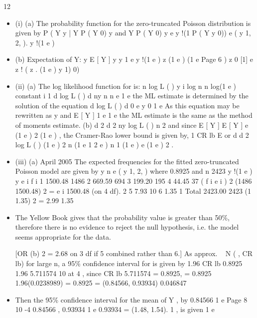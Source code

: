 \documentclass[a4paper,12pt]{article}
\begin{document}
12
\begin{itemize}
\item (i)
(a)
The probability function for the zero-truncated Poisson distribution is given by
P ( Y
y | Y
P ( Y
0)
y and Y
P ( Y 0)
y
e
y !(1 P ( Y
y
0))
e
( y 1, 2, ).
y !(1 e )
\item (b)
Expectation of Y:
y
E [ Y ]
y
y 1
e
y !(1 e )
z
(1 e )
(1 e
Page 6
)
z 0
[1]
e
z !
( z
.
(1 e
)
y 1)
0)%
\item (ii)
(a)
The log likelihood function for
is:
n
log L ( )
y i log
n
n log(1 e )
constant
i 1
d log L ( )
d
ny
n n
e
1 e
the ML estimate is determined by the solution of the equation
d log L ( )
d
0
e
y
0
1 e
As this equation may be rewritten as
y
and E [ Y ]
1 e
1 e
the ML estimate is the same as the method of moments estimate.
(b)
d 2
d
2
ny
log L ( )
n
2
and since E [ Y ] E [ Y ]
e
(1 e ) 2
(1 e )
, the Cramer-Rao lower bound is
given by,
1
CR lb
E
or
d
d
2
log L ( )
(1 e ) 2
n (1 e
1
2
e )
n
1
(1 e )
e
(1 e ) 2
.
\item (iii)
(a)
April 2005
The expected frequencies for the fitted zero-truncated Poisson model are given by
y
n
e
( y 1, 2, ) where
0.8925 and n
2423
y !(1 e )
y
e i
f i
1
1500.48
1486
2
669.59
694
3
199.20
195
4
44.45
37
( f i e i ) 2
(1486 1500.48) 2
=
e i
1500.48
(on 4 df).
2
5
7.93
10
6
1.35
1
Total
2423.00
2423
(1 1.35) 2
= 2.99
1.35
\item 
The Yellow Book gives that the probability value is greater than 50\%, therefore there is no evidence to reject the null hypothesis, i.e. the model seems appropriate for the data.

[OR
(b)
2
= 2.68 on 3 df if
5 combined rather than 6.]
As approx. ~ N ( , CR lb) for large n, a 95\%  confidence interval for
is given by
1.96 CR lb
0.8925 1.96 5.711574 10
at
4
, since CR lb
5.711574
= 0.8925,
= 0.8925 1.96(0.0238989) = 0.8925
= (0.84566, 0.93934)
0.046847
\item 
Then the 95\%  confidence interval for the mean of Y ,
by
0.84566
1 e
Page 8
10 -4
0.84566
,
0.93934
1 e
0.93934
= (1.48, 1.54).
1
, is given
1 e
\end{itemize}
\end{document}
